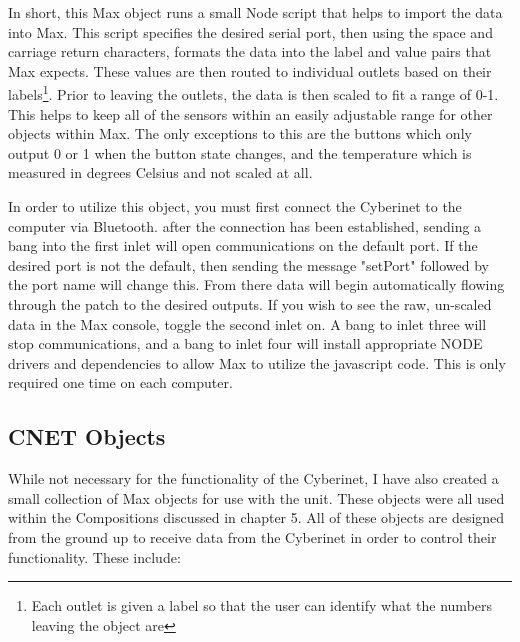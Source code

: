 In short, this Max object runs a small Node script that helps to import the data into Max. This script specifies the desired serial port, then using the space and carriage return characters, formats the data into the label and value pairs that Max expects. These values are then routed to individual outlets based on their labels\footnote{Each outlet is given a label so that the user can identify what the numbers leaving the object are}. Prior to leaving the outlets, the data is then scaled to fit a range of 0-1. This helps to keep all of the sensors within an easily adjustable range for other objects within Max. The only exceptions to this are the buttons which only output 0 or 1 when the button state changes, and the temperature which is measured in degrees Celsius and not scaled at all. 

In order to utilize this object, you must first connect the Cyberinet to the computer via Bluetooth. after the connection has been established, sending a bang into the first inlet will open communications on the default port. If the desired port is not the default, then sending the message "setPort" followed by the port name will change this. From there data will begin automatically flowing through the patch to the desired outputs. If you wish to see the raw, un-scaled data in the Max console, toggle the second inlet on. A bang to inlet three will stop communications, and a bang to inlet four will install appropriate NODE drivers and dependencies to allow Max to utilize the javascript code. This is only required one time on each computer.

\subsection{CNET Objects}

While not necessary for the functionality of the Cyberinet, I have also created a small collection of Max objects for use with the unit. These objects were all used within the Compositions discussed in chapter 5. All of these objects are designed from the ground up to receive data from the Cyberinet in order to control their functionality. These include:

